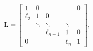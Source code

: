 \[\mathbf{L}=\begin{bmatrix}1&0&&&0\\
\ell_{2}&1&0&&\\
&\ddots&\ddots&\ddots&\\
&&\ell_{n-1}&1&0\\
0&&&\ell_{n}&1\end{bmatrix},\]